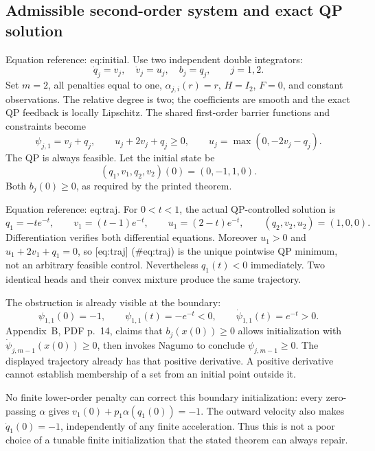 \documentclass[10pt]{article}
\begin{document}
\subsection*{Admissible second-order system and exact QP solution}
Equation reference: eq:initial. Use two independent double integrators: \[\dot q_j=v_j,\quad \dot v_j=u_j,\quad b_j=q_j,\qquad j=1,2.\] Set \(m=2\), all penalties equal to one, \(\alpha_{j,i}(r)=r\), \(H=I_2\), \(F=0\), and constant observations. The relative degree is two; the coefficients are smooth and the exact QP feedback is locally Lipschitz. The shared first-order barrier functions and constraints become \[\psi_{j,1}=v_j+q_j,\qquad
 u_j+2v_j+q_j\ge0,\qquad
 u_j=\max(0,-2v_j-q_j).\] The QP is always feasible. Let the initial state be \[
 (q_1,v_1,q_2,v_2)(0)=(0,-1,1,0).\] Both \(b_j(0)\ge0\), as required by the printed theorem.\par
Equation reference: eq:traj. For \(0<t<1\), the actual QP-controlled solution is \[
 q_1=-te^{-t},\qquad v_1=(t-1)e^{-t},\qquad
 u_1=(2-t)e^{-t},\qquad (q_2,v_2,u_2)=(1,0,0).\] Differentiation verifies both differential equations. Moreover \(u_1>0\) and \(u_1+2v_1+q_1=0\), so [eq:traj] (\#eq:traj) is the unique pointwise QP minimum, not an arbitrary feasible control. Nevertheless \(q_1(t)<0\) immediately. Two identical heads and their convex mixture produce the same trajectory.\par
The obstruction is already visible at the boundary: \[\psi_{1,1}(0)=-1,\qquad
 \psi_{1,1}(t)=-e^{-t}<0,\qquad
 \dot\psi_{1,1}(t)=e^{-t}>0.\] Appendix B, PDF p. 14, claims that \(b_j(x(0))\ge0\) allows initialization with \(\dot\psi_{j,m-1}(x(0))\ge0\), then invokes Nagumo to conclude \(\psi_{j,m-1}\ge0\). The displayed trajectory already has that positive derivative. A positive derivative cannot establish membership of a set from an initial point outside it.\par
No finite lower-order penalty can correct this boundary initialization: every zero-passing \(\alpha\) gives \(v_1(0)+p_1\alpha(q_1(0))=-1\). The outward velocity also makes \(\dot q_1(0)=-1\), independently of any finite acceleration. Thus this is not a poor choice of a tunable finite initialization that the stated theorem can always repair.\par
\end{document}
